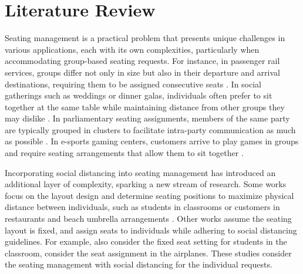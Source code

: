 \section{Literature Review}\label{literature}

Seating management is a practical problem that presents unique challenges in various applications, each with its own complexities, particularly when accommodating group-based seating requests. For instance, in passenger rail services, groups differ not only in size but also in their departure and arrival destinations, requiring them to be assigned consecutive seats \citep{clausen2010off, deplano2019offline}. In social gatherings such as weddings or dinner galas, individuals often prefer to sit together at the same table while maintaining distance from other groups they may dislike \citep{lewis2016creating}. In parliamentary seating assignments, members of the same party are typically grouped in clusters to facilitate intra-party communication as much as possible \citep{vangerven2022parliament}. In e-sports gaming centers, customers arrive to play games in groups and require seating arrangements that allow them to sit together \citep{kwag2022optimal}.

Incorporating social distancing into seating management has introduced an additional layer of complexity, sparking a new stream of research. Some works focus on the layout design and determine seating positions to maximize physical distance between individuals, such as students in classrooms \citep{bortolete2022support} or customers in restaurants and beach umbrella arrangements \citep{fischetti2023safe}. Other works assume the seating layout is fixed, and assign seats to individuals while adhering to social distancing guidelines. For example, \citet{bortolete2022support} also consider the fixed seat setting for students in the classroom, \citet{salari2020social} consider the seat assignment in the airplanes. These studies consider the seating management with social distancing for the individual requests.


